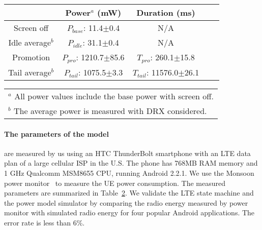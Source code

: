 \begin{table}[t]
\begin{center}
\begin{tabular}{|c|c|c|c|c|}\hline
            & Power$^{a}$ (mW)        & Duration (ms) \\
\hline
Screen off       & $P_{base}$: 11.4$\pm$0.4      & N/A       \\
Idle average$^{b}$   & $P_{idle}$: 31.1$\pm$0.4      & N/A       \\
Promotion   & $P_{pro}$: 1210.7$\pm$85.6   & $T_{pro}$: 260.1$\pm$15.8 \\
Tail average$^{b}$        & $P_{tail}$: 1075.5$\pm$3.3    & $T_{tail}$: 11576.0$\pm$26.1 \\
\hline
\end{tabular}
\begin{tabular}{l}
\\{$^a$} All power values include the base power with screen off.
\\{$^b$} The average power is measured with DRX considered.
\end{tabular}
\label{tab:lte_para}
\end{center}
\end{table}

\paragraph{The parameters of the model} are measured by us using an HTC ThunderBolt smartphone with an LTE data plan of a large cellular ISP in the U.S. The phone has 768MB RAM memory and 1 GHz Qualcomm MSM8655 CPU, running Android 2.2.1. We use the Monsoon power monitor~\cite{monsoon} to measure the UE power consumption.
The measured parameters are summarized in Table~\ref{tab:lte_para}. We validate the LTE state machine and the power model simulator by comparing the radio energy measured by power monitor with simulated radio energy for four popular Android applications. The error rate is less than 6\%.

